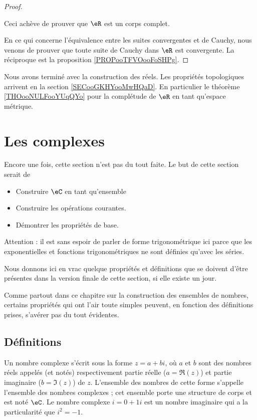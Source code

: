 \begin{proof}
\begin{subproof}
        Ceci achève de prouver que \( \eR\) est un corps complet.
        \end{subproof}

        En ce qui concerne l'équivalence entre les suites convergentes et de Cauchy, nous venons de prouver que toute suite de Cauchy dans \( \eR\) est convergente. La réciproque est la proposition \ref{PROPooTFVOooFoSHPg}.

\end{proof}

Nous avons terminé avec la construction des réels. Les propriétés topologiques arrivent en la section \ref{SECooGKHYooMwHQaD}. En particulier le théorème \ref{THOooNULFooYUqQYo} pour la complétude de \( \eR\) en tant qu'espace métrique.

\section{Les complexes}

\begin{probleme}
    Encore une fois, cette section n'est pas du tout faite. Le but de cette section serait de 
    \begin{itemize}
        \item Construire \( \eC\) en tant qu'ensemble
        \item Construire les opérations courantes.
        \item Démontrer les propriétés de base.
    \end{itemize}
    Attention : il est sans espoir de parler de forme trigonométrique ici parce que les exponentielles et fonctions trigonométriques ne sont définies qu'avec les séries.

    Nous donnons ici en vrac quelque propriétés et définitions que se doivent d'être présentes dans la version finale de cette section, si elle existe un jour.

    Comme partout dans ce chapitre sur la construction des ensembles de nombres, certains propriétés qui ont l'air toute simples peuvent, en fonction des définitions prises, s'avérer pas du tout évidentes.
\end{probleme}


 \subsection{Définitions}
 Un nombre complexe s'écrit sous la forme $z = a + b i$, où $a$ et $b$
 sont des nombres réels appelés (et notés) respectivement partie réelle
 ($a = \Re(z)$) et partie imaginaire ($b = \Im(z)$) de $z$. L'ensemble
 des nombres de cette forme s'appelle l'ensemble des nombres complexes
 ; cet ensemble porte une structure de corps et est noté $\eC$. Le
 nombre complexe $i = 0 + 1 i$ est un nombre imaginaire qui a la
 particularité que $i^2 = -1$.

